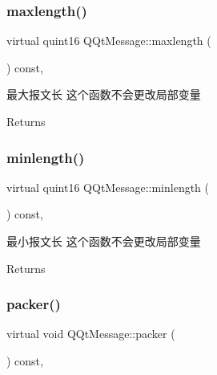 \subsubsection{\texorpdfstring{maxlength()}{maxlength()}}
{\footnotesize\ttfamily virtual quint16 Q\+Qt\+Message\+::maxlength (\begin{DoxyParamCaption}{ }\end{DoxyParamCaption}) const\hspace{0.3cm}{\ttfamily [inline]}, {\ttfamily [virtual]}}



最大报文长 这个函数不会更改局部变量 

\begin{DoxyReturn}{Returns}

\end{DoxyReturn}
\mbox{\label{class_q_qt_message_aa787045396462da8a56651e40dec7896}} 
\subsubsection{\texorpdfstring{minlength()}{minlength()}}
{\footnotesize\ttfamily virtual quint16 Q\+Qt\+Message\+::minlength (\begin{DoxyParamCaption}{ }\end{DoxyParamCaption}) const\hspace{0.3cm}{\ttfamily [inline]}, {\ttfamily [virtual]}}



最小报文长 这个函数不会更改局部变量 

\begin{DoxyReturn}{Returns}

\end{DoxyReturn}
\mbox{\label{class_q_qt_message_af1885c2c3628495808dca66ee8d72e14}} 
\subsubsection{\texorpdfstring{packer()}{packer()}}
{\footnotesize\ttfamily virtual void Q\+Qt\+Message\+::packer (\begin{DoxyParamCaption}\item[{Q\+Byte\+Array \&}]{ }\end{DoxyParamCaption}) const\hspace{0.3cm}{\ttfamily [inline]}, {\ttfamily [virtual]}}



